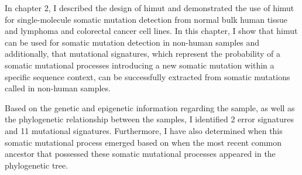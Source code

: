 In chapter 2, I described the design of himut and demonstrated the use of himut for single-molecule somatic mutation detection from normal bulk human tissue and lymphoma and colorectal cancer cell lines. In this chapter, I show that himut can be used for somatic mutation detection in non-human samples and additionally, that mutational signatures, which represent the probability of a somatic mutational processes introducing a new somatic mutation within a specific sequence context, can be successfully extracted from somatic mutations called in non-human samples. 

Based on the genetic and epigenetic information regarding the sample, as well as the phylogenetic relationship between the samples, I identified 2 error signatures and 11 mutational signatures. Furthermore, I have also determined when this somatic mutational process emerged based on when the most recent common ancestor that possessed these somatic mutational processes appeared in the phylogenetic tree. 


